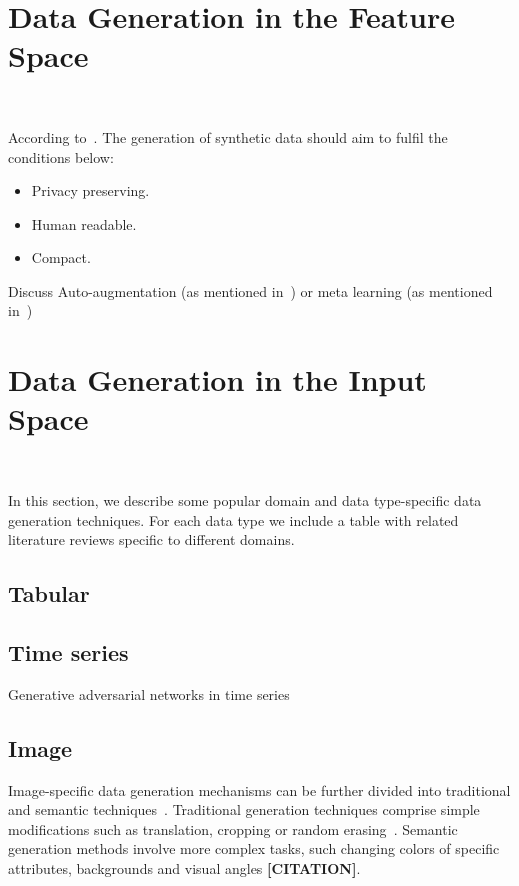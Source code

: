 \documentclass[parskip=full]{scrartcl}
\begin{document}
\section{Data Generation in the Feature Space}~\label{sec:feature-space}

According to~\cite{assefa2020generating}. The generation of synthetic data
should aim to fulfil the conditions below:

\begin{itemize}
    \item Privacy preserving.
    \item Human readable.
    \item Compact.
\end{itemize}

Discuss Auto-augmentation (as mentioned in~\cite{wang2020survey}) or meta
learning (as mentioned in~\cite{shorten2019survey})

\section{Data Generation in the Input Space}~\label{sec:input-space}

In this section, we describe some popular domain and data type-specific data
generation techniques. For each data type we include a table with related
literature reviews specific to different domains.

\subsection{Tabular}

\subsection{Time series}

Generative adversarial networks in time series 

\subsection{Image}

Image-specific data generation mechanisms can be further divided into
traditional and semantic techniques~\cite{wang2021regularizing}. Traditional
generation techniques comprise simple modifications such as translation,
cropping or random erasing~\cite{zhong2017random}. Semantic generation methods
involve more complex tasks, such changing colors of specific attributes,
backgrounds and visual angles \textbf{[CITATION]}. 
\end{document}
